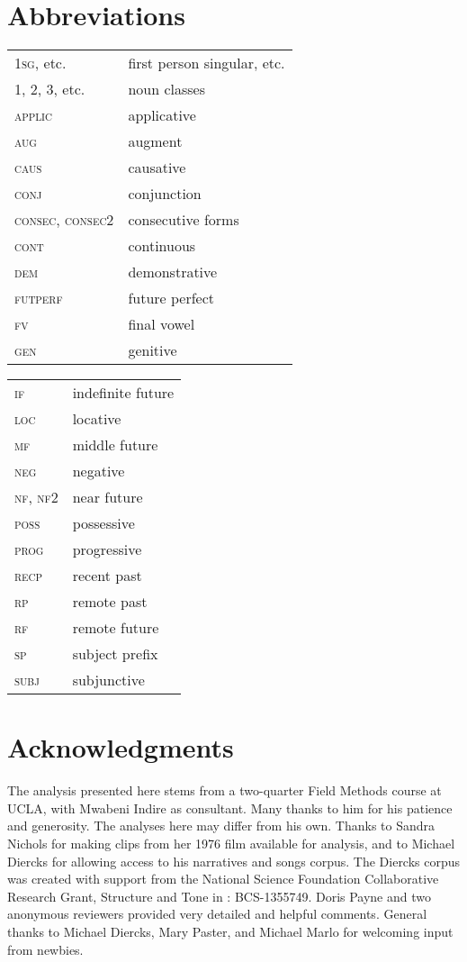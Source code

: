 \documentclass[output=paper]{langsci/langscibook}
\begin{document}
\section*{Abbreviations}
\begin{tabularx}{.55\textwidth}{ll}
\textsc{1sg}, etc. &  first person singular, etc. \\
1, 2, 3, etc. & noun classes \\
\textsc{applic} & applicative \\
\textsc{aug}  &  augment\\
\textsc{caus} &   causative \\
\textsc{conj}   &  conjunction \\
\textsc{consec, consec2} &  consecutive forms \\
\textsc{cont}  &  continuous \\
\textsc{dem}  &  demonstrative \\
\textsc{futperf} & future    perfect \\
\textsc{fv}  &  final vowel \\
\textsc{gen}  &  genitive \\
\end{tabularx}
\begin{tabularx}{.35\textwidth}{ll}
\textsc{if}  &  indefinite future \\
\textsc{loc}  &  locative \\
\textsc{mf} &   middle future \\
\textsc{neg}  &  negative \\
\textsc{nf, nf2} & near future \\
\textsc{poss}  &  possessive \\
\textsc{prog}  &  progressive \\
\textsc{recp}  &  recent past \\
\textsc{rp}  &  remote past \\
\textsc{rf}  &  remote future \\
\textsc{sp}  &  subject prefix \\
\textsc{subj}   & subjunctive \\ 
\end{tabularx} 

\section*{Acknowledgments}

The analysis presented here stems from a two-quarter Field Methods course at UCLA, with Mwabeni Indire as  consultant. Many thanks to him for his patience and generosity. The analyses here may differ from his own. Thanks to Sandra Nichols for making clips from her 1976 film available for analysis, and to Michael Diercks for allowing access to his narratives and songs corpus. The Diercks corpus was created with support from the National Science Foundation Collaborative Research Grant, Structure and Tone in : BCS-1355749. Doris Payne and two anonymous reviewers provided very detailed and helpful comments. General thanks to Michael Diercks, Mary Paster, and Michael Marlo for welcoming input from  newbies.

\printbibliography[heading=subbibliography,notkeyword=this]
\end{document}
